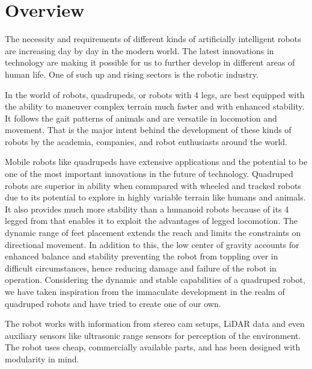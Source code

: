 \section{Overview}

The necessity and requirements of different kinds of artificially intelligent robots are increasing day by day in the modern world. The latest innovations in technology are making it possible for us to further develop in different areas of human life. One of such up and rising sectors is the robotic industry. 

In the world of robots, quadrupeds, or robots with 4 legs, are best equipped with the ability to maneuver complex terrain much faster and with enhanced stability. It follows the gait patterns of animals and are versatile in locomotion and movement. That is the major intent behind the development of these kinds of robots by the academia, companies, and robot enthusiasts around the world.

Mobile robots like quadrupeds have extensive applications and the potential to be one of the most important innovations in the future of technology. Quadruped robots are superior in ability when commpared with wheeled and tracked robots due to its potential to explore in highly variable terrain like humans and animals. It also provides much more stability than a humanoid robots because of its 4 legged from that enables it to exploit the advantages of legged locomotion. The dynamic range of feet placement extends the reach and limits the constraints on directional movement. In addition to this, the low center of gravity accounts for enhanced balance and stability preventing the robot from toppling over in difficult circumstances, hence reducing damage and failure of the robot in operation. Considering the dynamic and stable capabilities of a quadruped robot, we have taken inspiration from the immaculate development in the realm of quadruped robots and have tried to create one of our own.

The robot works with information from stereo cam setups, LiDAR data and even auxiliary sensors like ultrasonic range sensors for perception of the environment. The robot uses cheap, commercially available parts, and has been designed with modularity in mind.